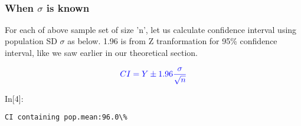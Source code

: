 \documentclass[float=false,crop=false]{standalone}
\begin{document}
    
    \begin{center}
    \end{center}
    { \hspace*{\fill} \\}
    
    \subsubsection{\texorpdfstring{When \(\sigma\) is
known}{When \textbackslash{}sigma is known}}\label{when-sigma-is-known}

For each of above sample set of size 'n', let us calculate confidence
interval using population SD \(\sigma\) as below. 1.96 is from Z
tranformation for 95\% confidence interval, like we saw earlier in our
theoretical section.

\begin{equation}
\color{blue}{CI = Y \pm 1.96 \dfrac{\sigma}{\sqrt{n}}}  
\end{equation}
\begin{InVerbatim}[commandchars=\\\{\},fontsize=\scriptsize]
{\color{incolor}In[{\color{incolor}4}]:}    
        
            
        
          
\end{InVerbatim}
    \begin{Verbatim}[commandchars=\\\{\},fontsize=\footnotesize]
CI containing pop.mean:96.0\%

    \end{Verbatim}

    \begin{center}
    \end{center}
    { \hspace*{\fill} \\}
    
\end{document}
